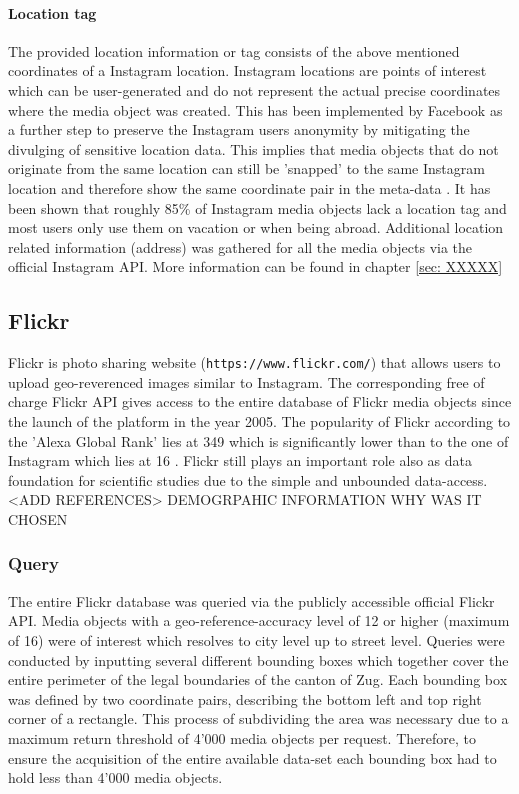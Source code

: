 \paragraph{Location tag}
The provided location information or tag consists of the above mentioned coordinates of a Instagram location. Instagram locations are points of interest which can be user-generated and do not represent the actual precise coordinates where the media object was created. This has been implemented by Facebook as a further step to preserve the Instagram users anonymity by mitigating the divulging of sensitive location data. This implies that media objects that do not originate from the same location can still be 'snapped' to the same Instagram location and therefore show the same coordinate pair in the meta-data \parencite{Instagram}.
It has been shown that roughly 85\% of Instagram media objects lack a location tag \parencite{XY} and most users only use them on vacation or when being abroad.
Additional location related information (address) was gathered for all the media objects via the official Instagram API. More information can be found in chapter \ref{sec: XXXXX}


\subsection{Flickr} \label{flickr}
Flickr is photo sharing website (\texttt{https://www.flickr.com/}) that allows users to upload geo-reverenced images similar to Instagram. The corresponding free of charge Flickr API gives access to the entire database of Flickr media objects since the launch of the platform in the year 2005. The popularity of Flickr according to the 'Alexa Global Rank' lies at 349 \parencite{Alexa.com2019a} which is significantly lower than to the one of Instagram which lies at 16 \parencite{Alexa.com2019}. Flickr still plays an important role also as data foundation for scientific studies due to the simple and unbounded data-access. <ADD REFERENCES>
DEMOGRPAHIC INFORMATION
WHY WAS IT CHOSEN
\subsubsection{Query} \label{flickr_query}
The entire Flickr database was queried via the publicly accessible official Flickr API. Media objects with a geo-reference-accuracy level of 12 or higher (maximum of 16) were of interest which resolves to city level up to street level. Queries were conducted by inputting several different bounding boxes which together cover the entire perimeter of the legal boundaries of the canton of Zug. Each bounding box was defined by two coordinate pairs, describing the bottom left and top right corner of a rectangle. This process of subdividing the area was necessary due to a maximum return threshold of 4'000 media objects per request. Therefore, to ensure the acquisition of the entire available data-set each bounding box had to hold less than 4'000 media objects.
